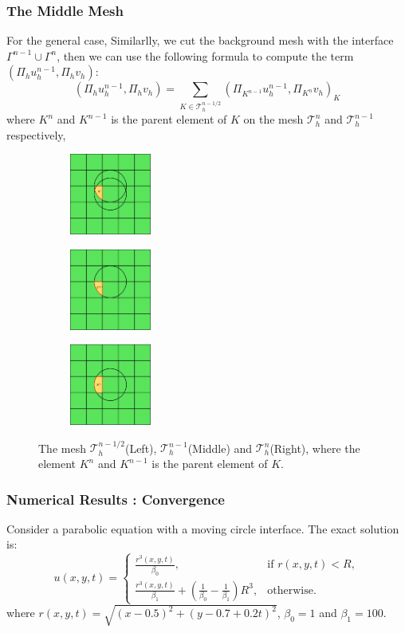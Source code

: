 \documentclass[notheorems,serif]{beamer}
\begin{document}
\begin{CJK}{UTF8}{gkai}
\begin{frame}
    \frametitle{The Middle Mesh}
For the general
case, Similarlly, we cut the background mesh with the interface
$\Gamma^{n-1}\cup\Gamma^n$, 
then we can use the following formula to compute the term 
$(\Pi_h u_h^{n-1}, \Pi_h v_h)$:
$$
(\Pi_h u_h^{n-1}, \Pi_h v_h) = \sum_{K\in \mathcal{T}_h^{n-1/2}}
(\Pi_{K^{n-1}}u_h^{n-1}, \Pi_{K^n}v_h)_{K}
$$
where $K^{n}$ and $K^{n-1}$ is the parent element of $K$ on the mesh
$\mathcal{T}_h^n$ and $\mathcal{T}_h^{n-1}$ respectively,
\begin{figure}[h]
\centering
\begin{subfigure}{.3\textwidth}
    \centering
    \includegraphics[width=1.05in]{../figures/movingmaxwell/meshncut.pdf}
\end{subfigure}
\begin{subfigure}{.3\textwidth}
    \centering
    \includegraphics[width=1.05in]{../figures/movingmaxwell/meshn_1.pdf}
\end{subfigure}
\begin{subfigure}{.3\textwidth}
    \centering
     \includegraphics[width=1.05in]{../figures/movingmaxwell/meshn.pdf}
\end{subfigure}
\caption{The mesh $\mathcal{T}_h^{n-1/2}$(Left), $\mathcal{T}_h^{n-1}$(Middle)
    and $\mathcal{T}_h^{n}$(Right), where the element $K^{n}$ and $K^{n-1}$ is
the parent element of $K$.}
\end{figure}
\end{frame}

\begin{frame}
    \frametitle{Numerical Results : Convergence}
Consider a parabolic equation with a moving circle interface. 
The exact solution is:
\begin{equation}
  u(x,y,t) = \left\{ 
    \begin{matrix}
        \frac{r^3(x, y, t)}{\beta_0}, & \text{if } r(x, y, t) < R,\\
        \frac{r^3(x, y, t)}{\beta_1} + (\frac{1}{\beta_0} - \frac{1}{\beta_1})R^3, & \text{otherwise}.
    \end{matrix}
    \right.
\end{equation}
where $r(x, y, t) = \sqrt{(x-0.5)^2 + (y-0.7+0.2t)^2}$, $\beta_0 = 1$ and
$\beta_1 = 100$.


\end{frame}
\end{CJK}
\end{document}
